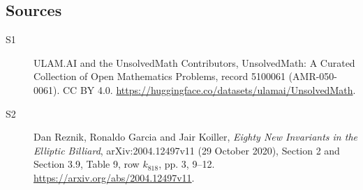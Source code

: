 \documentclass[11pt]{article}
\begin{document}
\subsection{Sources}
\begin{description}
\item[\hypertarget{source:5100061:1}{S1}] ULAM.AI and the UnsolvedMath Contributors, UnsolvedMath: A Curated Collection of Open Mathematics Problems, record 5100061 (AMR-050-0061). CC BY 4.0. \url{https://huggingface.co/datasets/ulamai/UnsolvedMath}.
\item[\hypertarget{source:5100061:2}{S2}] Dan Reznik, Ronaldo Garcia and Jair Koiller, \emph{Eighty New Invariants in the Elliptic Billiard}, arXiv:2004.12497v11 (29 October 2020), Section 2 and Section 3.9, Table 9, row $k_{818}$, pp. 3, 9--12. \url{https://arxiv.org/abs/2004.12497v11}.
\end{description}
\label{end:5100061}
\end{document}
